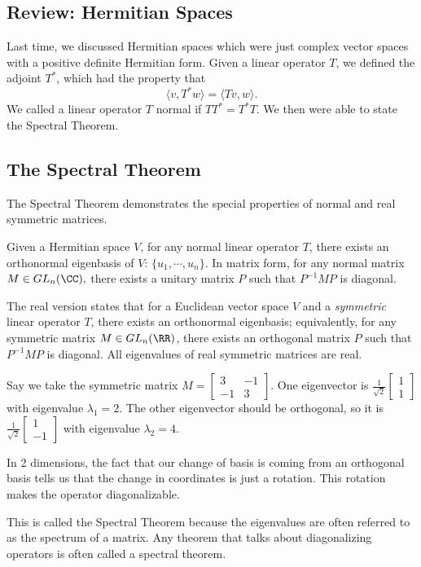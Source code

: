 \subsection{Review: Hermitian Spaces}
Last time, we discussed Hermitian spaces which were just complex vector spaces with a positive definite Hermitian form.  
Given a linear operator $T$, we defined the adjoint $T^*$, which had the property that \[\langle v, T^* w \rangle = \langle Tv, w\rangle. \]
We called a linear operator $T$ normal if $TT^* = T^* T$. 
We then were able to state the Spectral Theorem.

\subsection{The Spectral Theorem}

The Spectral Theorem demonstrates the special properties of normal and real symmetric matrices.
\begin{theorem}
Given a Hermitian space $V$, for any normal linear operator $T$, there exists an orthonormal eigenbasis of $V$: $\{u_1, \cdots, u_n\}.$ In matrix form, for any normal matrix $M \in GL_n(\CC),$ there exists a unitary matrix $P$ such that $P^{-1} M P$ is diagonal.


The real version states that for a Euclidean vector space $V$ and a \emph{symmetric} linear operator $T$, there exists an orthonormal eigenbasis; equivalently, for any symmetric matrix $M \in GL_n(\RR)$, there exists an orthogonal matrix $P$ such that $P^{-1}MP$ is diagonal. All eigenvalues of real symmetric matrices are real.
\end{theorem}

\begin{example}
    Say we take the symmetric matrix $M = \begin{bmatrix} 3 & -1 \\ -1 & 3 \end{bmatrix}$.
    One eigenvector is $\frac{1}{\sqrt{2}}\begin{bmatrix}1 \\ 1 \end{bmatrix}$ with eigenvalue $\lambda_1 = 2$. 
    The other eigenvector should be orthogonal, so it is $\frac{1}{\sqrt{2}}\begin{bmatrix}1 \\ -1 \end{bmatrix}$ with eigenvalue $\lambda_2 = 4$.

    In 2 dimensions, the fact that our change of basis is coming from an orthogonal basis tells us that the change in coordinates is just a rotation. 
    This rotation makes the operator diagonalizable. 
\end{example}
This is called the Spectral Theorem because the eigenvalues are often referred to as the spectrum of a matrix. 
Any theorem that talks about diagonalizing operators is often called a spectral theorem. 

